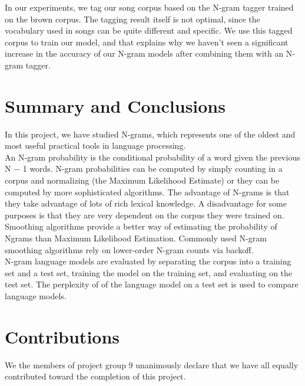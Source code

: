 \documentclass[a4paper,12pt]{article}
\begin{document}
In our experiments, we tag our song corpus based on the N-gram tagger trained on the brown corpus. The tagging result itself is not optimal, since the vocabulary used in songs can be quite different and specific. We use this tagged corpus to train our model, and that explains why we haven't seen a significant increase in the accuracy of our N-gram models after combining them with an N-gram tagger.


\section{Summary and Conclusions}
In this project, we have studied N-grams, which represents one of the oldest and most useful practical tools in language processing. \\
An N-gram probability is the conditional probability of a word given the previous
N − 1 words. N-gram probabilities can be computed by simply counting in a
corpus and normalizing (the Maximum Likelihood Estimate) or they can be
computed by more sophisticated algorithms. The advantage of N-grams is that
they take advantage of lots of rich lexical knowledge. A disadvantage for some
purposes is that they are very dependent on the corpus they were trained on.\\
Smoothing algorithms provide a better way of estimating the probability of Ngrams
than Maximum Likelihood Estimation. Commonly used N-gram smoothing
algorithms rely on lower-order N-gram counts via backoff.\\
N-gram language models are evaluated by separating the corpus into a training
set and a test set, training the model on the training set, and evaluating on the test
set. The perplexity of of the language model on a test set is used to compare
language models.


\label{sec:summary}



\section{Contributions}
\label{sec:contributions}
We the members of project group 9 unanimously declare that 
we have all equally contributed toward the completion of this
project.




\end{document}
